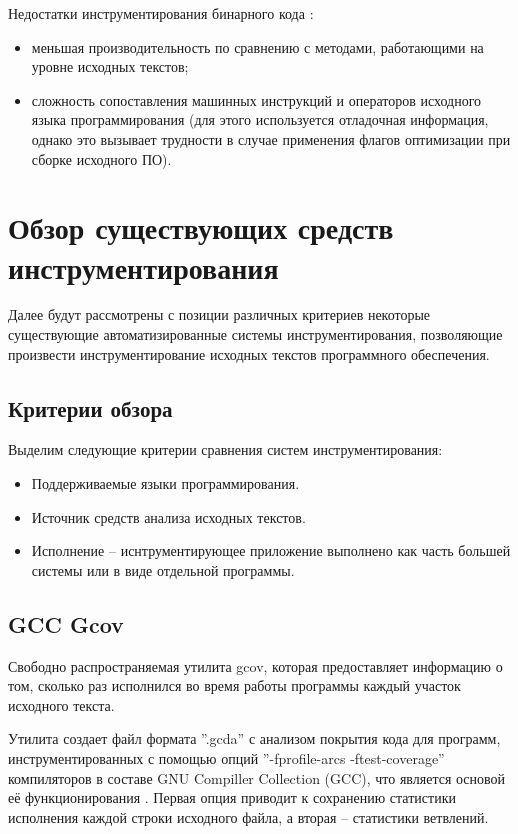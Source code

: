 Недостатки инструментирования бинарного кода \cite{lomakina2016testirovanie}:
\begin{itemize}[noitemsep]
  \item меньшая производительность по сравнению с методами, работающими на уровне исходных текстов;
  \item сложность сопоставления машинных инструкций и операторов исходного языка программирования (для этого используется отладочная информация, однако это вызывает трудности в случае применения флагов оптимизации при сборке исходного ПО).
\end{itemize}

\section{Обзор существующих средств инструментирования}

Далее будут рассмотрены с позиции различных критериев некоторые существующие автоматизированные системы инструментирования, позволяющие произвести инструментирование исходных текстов программного обеспечения.

\subsection{Критерии обзора}

Выделим следующие критерии сравнения систем инструментирования:
\begin{itemize}[noitemsep]
  \item Поддерживаемые языки программирования.
  \item Источник средств анализа исходных текстов.
  \item Исполнение -- иснтрументирующее приложение выполнено как часть большей системы или в виде отдельной программы.
\end{itemize}

\subsection{GCC Gcov}
Свободно распространяемая утилита gcov, которая предоставляет информацию о том, сколько раз исполнился во время работы программы каждый участок исходного текста.

Утилита создает файл формата ''.gcda'' с анализом покрытия кода для программ, инструментированных с помощью опций ''-fprofile-arcs -ftest-coverage'' компиляторов в составе GNU Compiller Collection (GCC), что является основой её функционирования \cite{reviewGCCGcov}. Первая опция приводит к сохранению статистики исполнения каждой строки исходного файла, а вторая -- статистики ветвлений.

